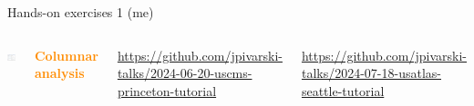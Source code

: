 \documentclass[aspectratio=169]{beamer}
\begin{document}
\begin{frame}{Hands-on exercises 1 (me)}
\vspace{0.25 cm}
\large
\begin{columns}
\includegraphics[width=\linewidth]{PLOTS/teacher-student-notebook-pair.png}

\textcolor{darkorange}{\bf Columnar analysis}

\tiny
\vspace{0.2 cm}
\textcolor{blue}{\href{https://github.com/jpivarski-talks/2024-06-20-uscms-princeton-tutorial}{https://github.com/jpivarski-talks/2024-06-20-uscms-princeton-tutorial}}

\textcolor{blue}{\href{https://github.com/jpivarski-talks/2024-07-18-usatlas-seattle-tutorial}{https://github.com/jpivarski-talks/2024-07-18-usatlas-seattle-tutorial}}

\small
\vspace{0.2 cm}

\vspace{0.2 cm}

\vspace{0.2 cm}

\vspace{0.2 cm}
\end{columns}
\end{frame}
\end{document}
